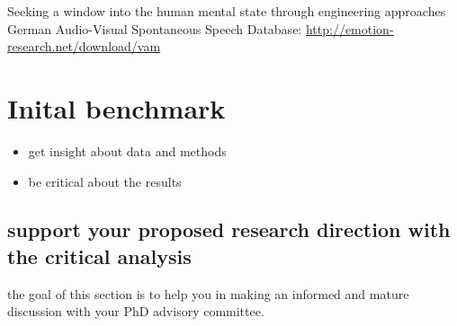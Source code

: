 Seeking a window into the human mental state through engineering approaches\\

German Audio-Visual Spontaneous Speech Database:
\url{http://emotion-research.net/download/vam}


\section{Inital benchmark}

\begin{itemize}
\item get insight about data and methods
\item be critical about the results
\end{itemize}



\subsection{support your proposed research direction with the critical analysis}
the goal of this section is to help you in making an informed and mature discussion with your PhD advisory committee.


